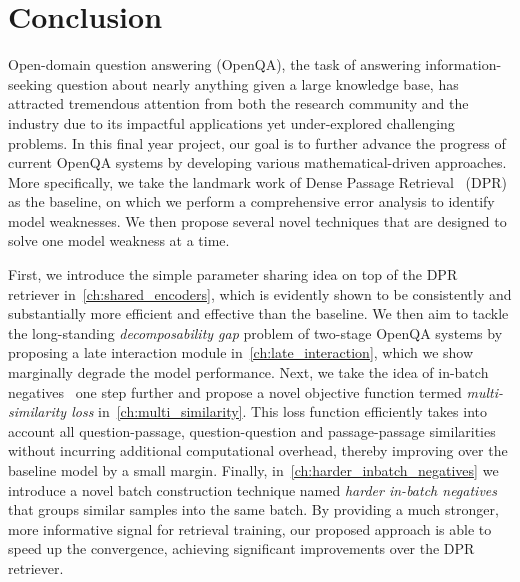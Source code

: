 
\chapter{Conclusion} %
\label{ch:conclusion}


%
Open-domain question answering (OpenQA), the task of answering information-seeking question about nearly anything given a large knowledge base, has attracted tremendous attention from both the research community and the industry due to its impactful applications yet under-explored challenging problems.
%
In this final year project, our goal is to further advance the progress of current OpenQA systems by developing various mathematical-driven approaches.
%
More specifically, we take the landmark work of Dense Passage Retrieval~\cite{karpukhin2020dense} (DPR) as the baseline, on which we perform a comprehensive error analysis to identify model weaknesses.
%
We then propose several novel techniques that are designed to solve one model weakness at a time.

%
First, we introduce the simple parameter sharing idea on top of the DPR retriever in~\cref{ch:shared_encoders}, which is evidently shown to be consistently and substantially more efficient and effective than the baseline.
%
We then aim to tackle the long-standing \emph{decomposability gap} problem of two-stage OpenQA systems by proposing a late interaction module in~\cref{ch:late_interaction}, which we show marginally degrade the model performance.
%
Next, we take the idea of in-batch negatives~\cite{karpukhin2020dense} one step further and propose a novel objective function termed \emph{multi-similarity loss} in~\cref{ch:multi_similarity}.
%
This loss function efficiently takes into account all question-passage, question-question and passage-passage similarities without incurring additional computational overhead, thereby improving over the baseline model by a small margin.
%
Finally, in~\cref{ch:harder_inbatch_negatives} we introduce a novel batch construction technique named \emph{harder in-batch negatives} that groups similar samples into the same batch.
%
By providing a much stronger, more informative signal for retrieval training, our proposed approach is able to speed up the convergence, achieving significant improvements over the DPR retriever.